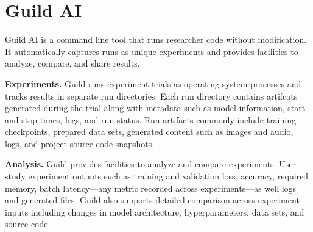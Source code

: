 \documentclass{article}
\begin{document}

\printAffiliationsAndNotice{\sysmlEqualContribution}

\section{Guild AI}

Guild AI is a command line tool that runs researcher code without
modification. It automatically captures runs as unique experiments and
provides facilities to analyze, compare, and share results.

\textbf{Experiments.} Guild runs experiment trials as operating system
processes and tracks results in separate run directories. Each run
directory contains artifcats generated during the trial along with
metadata such as model information, start and stop times, logs, and
run status. Run artifacts commonly include training checkpoints,
prepared data sets, generated content such as images and audio, logs,
and project source code snapshots.

\textbf{Analysis.} Guild provides facilities to analyze and compare
experiments. User study experiment outputs such as training and
validation loss, accuracy, required memory, batch latency---any metric
recorded across experiments---as well logs and generated files. Guild
also supports detailed comparison across experiment inputs including
changes in model architecture, hyperparameters, data sets, and source
code.
\end{document}
